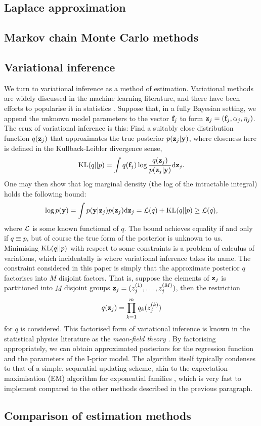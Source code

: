 \subsection{Laplace approximation}

\subsection{Markov chain Monte Carlo methods}

\subsection{Variational inference}

We turn to variational inference as a method of estimation. Variational methods are widely discussed in the machine learning literature, and there have been efforts to popularise it in statistics \citep{blei2017variational}.
Suppose that, in a fully Bayesian setting, we append the unknown model parameters to the vector ${\mathbf f}_j$ to form ${\mathbf z}_j = ({\mathbf f}_j, \alpha_j, \eta_j)$.
The crux of variational inference is this: Find a suitably close distribution function $q({\mathbf z}_j)$ that approximates the true posterior $p({\mathbf z}_j|{\mathbf y})$, where closeness here is defined in the Kullback-Leibler divergence sense,
\[
  \operatorname{KL}(q||p) = \int q({\mathbf f}_j) \log \frac{q({\mathbf z}_j)}{p({\mathbf z}_j|{\mathbf y})} \text{d} {\mathbf z}_j.
\]
One may then show that log marginal density (the log of the intractable integral) holds the following bound:
\[
  \log p({\mathbf y}) = \int p({\mathbf y}|{\mathbf z}_j)p({\mathbf z}_j) \text{d} {\mathbf z}_j = {\mathcal L}(q) + \operatorname{KL}(q||p) \geq {\mathcal L}(q),
\]
where ${\mathcal L}$ is some known functional of $q$. 
The bound achieves equality if and only if $q \equiv p$, but of course the true form of the posterior is unknown to us.
Minimising $\operatorname{KL}(q||p)$ with respect to some constraints is a problem of calculus of variations, which incidentally is where variational inference takes its name.
The constraint considered in this paper is simply that the approximate posterior $q$ factorises into $M$ disjoint factors.
That is, suppose the elements of ${\mathbf z}_j$ is partitioned into $M$ disjoint groups ${\mathbf z}_j = (z_j^{(1)},\dots,z_j^{(M)})$, then the restriction
\[
  q({\mathbf z}_j) = \prod_{k=1}^m q_k(z_j^{(k)})
\]
for $q$ is considered.
This factorised form of variational inference is known in the statistical physics literature as the \emph{mean-field theory} \citep{itzykson1991statistical}.
By factorising appropriately, we can obtain approximated posteriors for the regression function and the parameters of the I-prior model.
The algorithm itself typically condenses to that of a simple, sequential updating scheme, akin to the expectation-maximisation (EM) algorithm for exponential families \citep{mclachlan2007algorithm}, which is very fast to implement compared to the other methods described in the previous paragraph.

\subsection{Comparison of estimation methods}